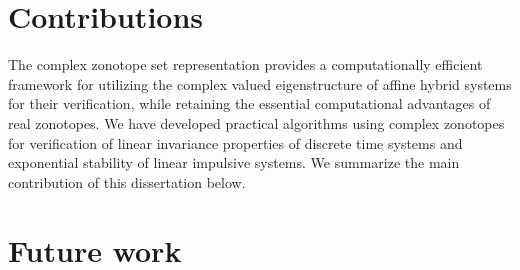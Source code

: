 \section{Contributions}
The complex zonotope set representation provides a computationally
efficient framework for utilizing the complex valued eigenstructure of
affine hybrid systems for their verification, while retaining the
essential computational advantages of real zonotopes.  We have
developed practical algorithms using complex zonotopes for
verification of linear invariance properties of discrete time systems
and exponential stability of linear impulsive systems.  We summarize
the main contribution of this dissertation below.
%


\section{Future work}
